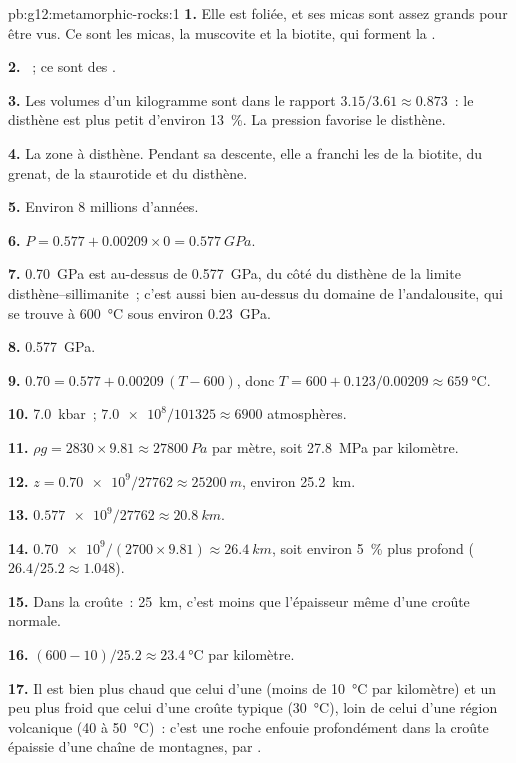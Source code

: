 \begin{solution}{pb:g12:metamorphic-rocks:1}
\textbf{1.} Elle est foliée, et ses micas sont assez grands pour être vus.
Ce sont les micas, la muscovite et la biotite, qui forment la .

\textbf{2.} ~; ce sont des .

\textbf{3.} Les volumes d'un kilogramme sont dans le rapport
$3.15/3.61 \approx
0.873$~: le disthène est plus petit d'environ
\qty{13}{\percent}. La pression favorise le disthène.

\textbf{4.} La zone à disthène. Pendant sa descente, elle a franchi les
 de la biotite, du grenat, de la staurotide et du disthène.

\textbf{5.} Environ 8 millions d'années.

\textbf{6.} $P = 0.577 + 0.00209 \times 0 = \qty{0.577}{GPa}$.

\textbf{7.} \qty{0.70}{GPa} est au-dessus de \qty{0.577}{GPa}, du côté du
disthène de la limite disthène--sillimanite~; c'est aussi bien au-dessus du
domaine de l'andalousite, qui se trouve à \qty{600}{\celsius} sous environ
\qty{0.23}{GPa}.

\textbf{8.} \qty{0.577}{GPa}.

\textbf{9.} $0.70 = 0.577 + 0.00209\,(T - 600)$, donc $T = 600 +
0.123/0.00209 \approx \qty{659}{\celsius}$.

\textbf{10.} \qty{7.0}{kbar}~; $\num{7.0e8}/101325 \approx \num{6900}$
atmosphères.

\textbf{11.} $\rho g = 2830 \times 9.81 \approx \qty{27800}{Pa}$ par mètre,
soit \qty{27.8}{MPa} par kilomètre.

\textbf{12.} $z = \num{0.70e9}/\num{27762} \approx \qty{25200}{m}$, environ
\qty{25.2}{km}.

\textbf{13.} $\num{0.577e9}/\num{27762} \approx \qty{20.8}{km}$.

\textbf{14.} $\num{0.70e9}/(2700 \times 9.81) \approx \qty{26.4}{km}$, soit
environ \qty{5}{\percent} plus profond ($26.4/25.2 \approx 1.048$).

\textbf{15.} Dans la croûte~: \qty{25}{km}, c'est moins que l'épaisseur
même d'une croûte normale.

\textbf{16.} $(600 - 10)/25.2 \approx \qty{23.4}{\celsius}$ par kilomètre.

\textbf{17.} Il est bien plus chaud que celui d'une  (moins
de \qty{10}{\celsius} par kilomètre) et un peu plus froid que celui d'une
croûte typique (\qty{30}{\celsius}), loin de celui d'une région volcanique
(40 à \qty{50}{\celsius})~: c'est une roche enfouie profondément dans la
croûte épaissie d'une chaîne de montagnes, par .


\end{solution}
